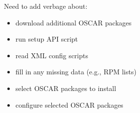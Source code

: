 \begin{discuss}
  Need to add verbage about:

  \begin{itemize}
  \item download additional OSCAR packages
  \item run setup API script
  \item read XML config scripts
  \item fill in any missing data (e.g., RPM lists)
  \item select OSCAR packages to install
  \item configure selected OSCAR packages
  \end{itemize}
\end{discuss}

